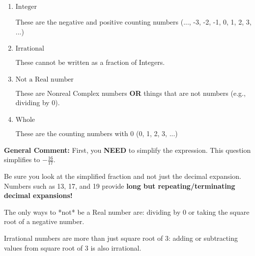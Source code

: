 \documentclass{extbook}[14pt]
\begin{document}
\begin{enumerate}
{\begin{enumerate}[label=\Alph*.]
* This is the correct option!
\item \( \text{Integer} \)

These are the negative and positive counting numbers (..., -3, -2, -1, 0, 1, 2, 3, ...)
\item \( \text{Irrational} \)

These cannot be written as a fraction of Integers.
\item \( \text{Not a Real number} \)

These are Nonreal Complex numbers \textbf{OR} things that are not numbers (e.g., dividing by 0).
\item \( \text{Whole} \)

These are the counting numbers with 0 (0, 1, 2, 3, ...)
\end{enumerate}

\textbf{General Comment:} First, you \textbf{NEED} to simplify the expression. This question simplifies to $-\frac{16}{17}$. 
 
 Be sure you look at the simplified fraction and not just the decimal expansion. Numbers such as 13, 17, and 19 provide \textbf{long but repeating/terminating decimal expansions!} 
 
 The only ways to *not* be a Real number are: dividing by 0 or taking the square root of a negative number. 
 
 Irrational numbers are more than just square root of 3: adding or subtracting values from square root of 3 is also irrational.
}
\end{enumerate}
\end{document}
